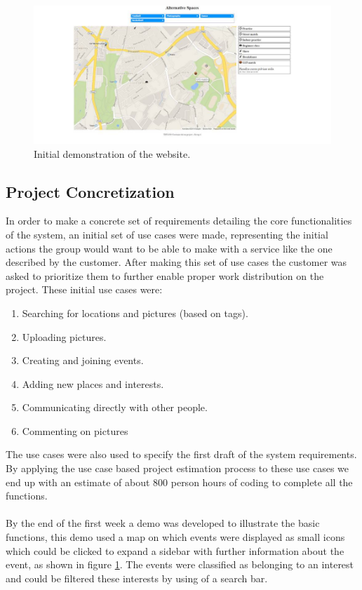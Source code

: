 \begin{figure}[bthp]
  \includegraphics[width=\linewidth]{./PreliminaryStudies/img/FirstDemo.jpg}
  \caption{Initial demonstration of the website.}
  \label{fig:PrelimWorkInitDemo}
\end{figure}

\subsection{Project Concretization}
\label{subsec:PrelimWorkConcret}

In order to make a concrete set of requirements detailing the core functionalities of the system, an initial set of use cases were made, representing the initial actions the group would want to be able to make with a service like the one described by the customer. After making this set of use cases the customer was asked to prioritize them to further enable proper work distribution on the project. These initial use cases were:

\begin{enumerate}
  \item Searching for locations and pictures (based on tags).
  \item Uploading pictures.
  \item Creating and joining events.
  \item Adding new places and interests.
  \item Communicating directly with other people.
  \item Commenting on pictures
\end{enumerate}

The use cases were also used to specify the first draft of the system requirements. By applying the use case based project estimation process to these use cases we end up with an estimate of about 800 person hours of coding to complete all the functions.
\paragraph{} By the end of the first week a demo was developed to illustrate the basic functions, this demo used a map on which events were displayed as small icons which could be clicked to expand a sidebar with further information about the event, as shown in figure \ref{fig:PrelimWorkInitDemo}. The events were classified as belonging to an interest and could be filtered these interests by using of a search bar.
